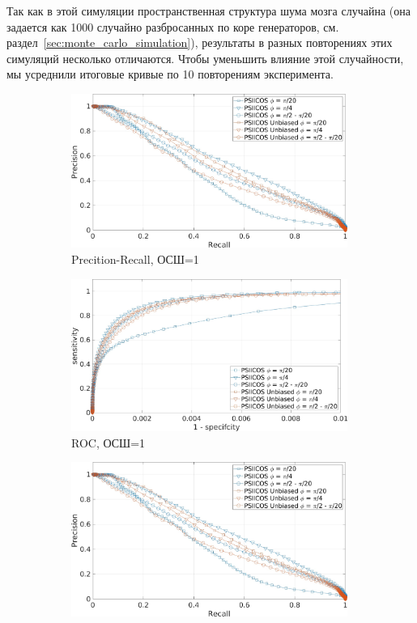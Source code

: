 Так как в этой симуляции пространственная структура шума мозга случайна
(она задается как 1000 случайно разбросанных по коре генераторов, см.
раздел~\ref{sec:monte_carlo_simulation}), результаты в разных повторениях
этих симуляций несколько отличаются. Чтобы уменьшить влияние этой случайности,
мы усреднили итоговые кривые по 10 повторениям эксперимента.

\begin{figure}[htbp]
    \begin{subfigure}[t]{0.5\textwidth}
        \includegraphics[width=0.99\textwidth]{../images/pre_rec_3_ntw_snr_1.jpg}
        \caption{Precition-Recall, ОСШ=1}\label{fig:psiicos_vs_unbiased_3_ntw_a}
    \end{subfigure}
    \begin{subfigure}[t]{0.5\textwidth}
        \includegraphics[width=0.99\textwidth]{../images/roc_3_ntw_snr_1.jpg}
        \caption{ROC, ОСШ=1}\label{fig:psiicos_vs_unbiased_3_ntw_b}
    \end{subfigure}
    \begin{subfigure}[t]{0.5\textwidth}
        \includegraphics[width=0.99\textwidth]{../images/pre_rec_3_ntw_snr_1.jpg}

\end{subfigure}
\end{figure}
